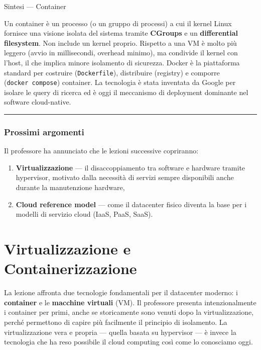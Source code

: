 \documentclass[
  italian,
  openany]{book}
\providecommand{\tightlist}{%
  \setlength{\itemsep}{0pt}\setlength{\parskip}{0pt}}
\begin{document}
\begin{calloutnote}{Sintesi — Container}

Un container è un processo (o un gruppo di processi) a cui il kernel
Linux fornisce una visione isolata del sistema tramite \textbf{CGroups}
e un \textbf{differential filesystem}. Non include un kernel proprio.
Rispetto a una VM è molto più leggero (avvio in millisecondi, overhead
minimo), ma condivide il kernel con l'host, il che implica minore
isolamento di sicurezza. Docker è la piattaforma standard per costruire
(\texttt{Dockerfile}), distribuire (registry) e comporre
(\texttt{docker\ compose}) container. La tecnologia è stata inventata da
Google per isolare le query di ricerca ed è oggi il meccanismo di
deployment dominante nel software cloud-native.

\end{calloutnote}

\begin{center}\rule{0.5\linewidth}{0.5pt}\end{center}

\subsection{Prossimi argomenti}\label{prossimi-argomenti}

Il professore ha annunciato che le lezioni successive copriranno:

\begin{enumerate}
\def\labelenumi{\arabic{enumi}.}
\tightlist
\item
  \textbf{Virtualizzazione} --- il disaccoppiamento tra software e
  hardware tramite hypervisor, motivato dalla necessità di servizi
  sempre disponibili anche durante la manutenzione hardware,
\item
  \textbf{Cloud reference model} --- come il datacenter fisico diventa
  la base per i modelli di servizio cloud (IaaS, PaaS, SaaS).
\end{enumerate}

\newpage

\chapter{Virtualizzazione e
Containerizzazione}\label{virtualizzazione-e-containerizzazione}

La lezione affronta due tecnologie fondamentali per il datacenter
moderno: i \textbf{container} e le \textbf{macchine virtuali} (VM). Il
professore presenta intenzionalmente i container per primi, anche se
storicamente sono venuti dopo la virtualizzazione, perché permettono di
capire più facilmente il principio di isolamento. La virtualizzazione
vera e propria --- quella basata su hypervisor --- è invece la
tecnologia che ha reso possibile il cloud computing così come lo
conosciamo oggi.
\end{document}
